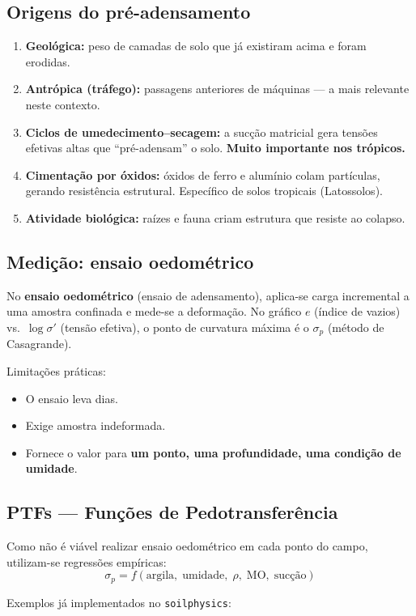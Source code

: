 \documentclass[12pt,a4paper]{article}
\newcommand{\Subsection}[1]{\needspace{10\baselineskip}\subsection{#1}}
\begin{document}
\Subsection{Origens do pré-adensamento}

\begin{enumerate}
  \item \textbf{Geológica:} peso de camadas de solo que já existiram acima e foram erodidas.
  \item \textbf{Antrópica (tráfego):} passagens anteriores de máquinas --- a mais relevante neste contexto.
  \item \textbf{Ciclos de umedecimento--secagem:} a sucção matricial gera tensões efetivas altas que ``pré-adensam'' o solo. \textbf{Muito importante nos trópicos.}
  \item \textbf{Cimentação por óxidos:} óxidos de ferro e alumínio colam partículas, gerando resistência estrutural. Específico de solos tropicais (Latossolos).
  \item \textbf{Atividade biológica:} raízes e fauna criam estrutura que resiste ao colapso.
\end{enumerate}

\Subsection{Medição: ensaio oedométrico}

No \textbf{ensaio oedométrico} (ensaio de adensamento), aplica-se carga incremental a uma amostra confinada e mede-se a deformação. No gráfico $e$ (índice de vazios) vs.\ $\log\sigma'$ (tensão efetiva), o ponto de curvatura máxima é o $\sigma_p$ (método de Casagrande).

Limitações práticas:
\begin{itemize}
  \item O ensaio leva dias.
  \item Exige amostra indeformada.
  \item Fornece o valor para \textbf{um ponto, uma profundidade, uma condição de umidade}.
\end{itemize}

\Subsection{PTFs --- Funções de Pedotransferência}

Como não é viável realizar ensaio oedométrico em cada ponto do campo, utilizam-se regressões empíricas:
\begin{equation}
  \sigma_p = f\!\left(\text{argila},\;\text{umidade},\;\rho,\;\text{MO},\;\text{sucção}\right)
  \label{eq:ptf}
\end{equation}

Exemplos já implementados no \texttt{soilphysics}:
\end{document}
